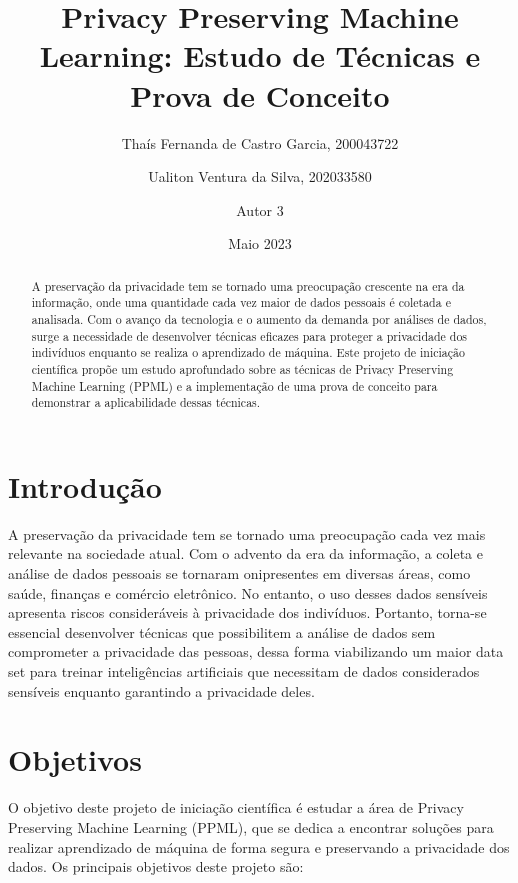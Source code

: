 \documentclass{article}
\begin{document}
\title{Privacy Preserving Machine Learning: Estudo de Técnicas e Prova de Conceito}
\author{Thaís Fernanda de Castro Garcia, 200043722}
\author{Ualiton Ventura da Silva, 202033580}
\author{Autor 3}
\date{Maio 2023}

\maketitle

\begin{abstract}
A preservação da privacidade tem se tornado uma preocupação crescente na era da informação, onde uma quantidade cada vez maior de dados pessoais é coletada e analisada. Com o avanço da tecnologia e o aumento da demanda por análises de dados, surge a necessidade de desenvolver técnicas eficazes para proteger a privacidade dos indivíduos enquanto se realiza o aprendizado de máquina. Este projeto de iniciação científica propõe um estudo aprofundado sobre as técnicas de Privacy Preserving Machine Learning (PPML) e a implementação de uma prova de conceito para demonstrar a aplicabilidade dessas técnicas.
\end{abstract}

\section{Introdução}
A preservação da privacidade tem se tornado uma preocupação cada vez mais relevante na sociedade atual. Com o advento da era da informação, a coleta e análise de dados pessoais se tornaram onipresentes em diversas áreas, como saúde, finanças e comércio eletrônico. No entanto, o uso desses dados sensíveis apresenta riscos consideráveis à privacidade dos indivíduos. Portanto, torna-se essencial desenvolver técnicas que possibilitem a análise de dados sem comprometer a privacidade das pessoas, dessa forma viabilizando um maior data set para treinar inteligências artificiais que necessitam de dados considerados sensíveis enquanto garantindo a privacidade deles.

\section{Objetivos}
O objetivo deste projeto de iniciação científica é estudar a área de Privacy Preserving Machine Learning (PPML), que se dedica a encontrar soluções para realizar aprendizado de máquina de forma segura e preservando a privacidade dos dados. Os principais objetivos deste projeto são:
\end{document}
